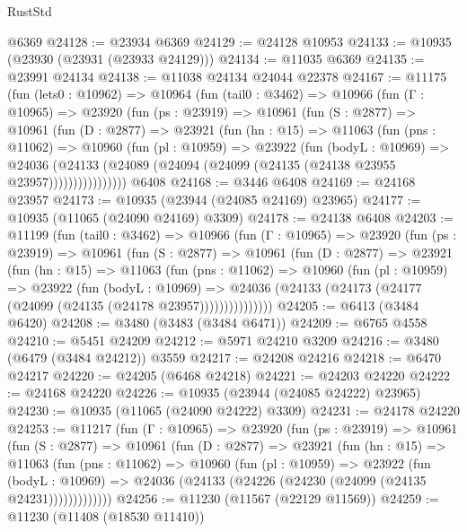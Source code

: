 \begin{lexlean}{RustStd}
\begin{coremodule}
{\begin{coremodule}
{{{{{{{{{{{{{{{{{{{{{{{{{{{{{{{{{{{{{{{{{{{{{{{{{{{{{{{{{{{{{{{{{{{{{{{{{{{{{{{{{{{{{    @6369
@24128 := @23934 @6369
@24129 := @24128 @10953
@24133 := @10935 (@23930 (@23931 (@23933 @24129)))
@24134 := @11035 @6369
@24135 := @23991 @24134
@24138 := @11038 @24134 @24044 @22378
@24167 := @11175
    (fun (lets0 : @10962) =>
    @10964
      (fun (tail0 : @3462) =>
      @10966
        (fun (Γ : @10965) =>
        @23920
          (fun (ps : @23919) =>
          @10961
            (fun (S : @2877) =>
            @10961
              (fun (D : @2877) =>
              @23921
                (fun (hn : @15) =>
                @11063
                  (fun (pns : @11062) =>
                  @10960
                    (fun (pl : @10959) =>
                    @23922
                      (fun (bodyL : @10969) =>
                      @24036
                        (@24133
                          (@24089 (@24094 (@24099 (@24135 (@24138 @23955 @23957))))))))))))))))
    @6408
@24168 := @3446 @6408
@24169 := @24168 @23957
@24173 := @10935 (@23944 (@24085 @24169) @23965)
@24177 := @10935 (@11065 (@24090 @24169) @3309)
@24178 := @24138 @6408
@24203 := @11199
    (fun (tail0 : @3462) =>
    @10966
      (fun (Γ : @10965) =>
      @23920
        (fun (ps : @23919) =>
        @10961
          (fun (S : @2877) =>
          @10961
            (fun (D : @2877) =>
            @23921
              (fun (hn : @15) =>
              @11063
                (fun (pns : @11062) =>
                @10960
                  (fun (pl : @10959) =>
                  @23922
                    (fun (bodyL : @10969) =>
                    @24036 (@24133 (@24173 (@24177 (@24099 (@24135 (@24178 @23957)))))))))))))))
@24205 := @6413 (@3484 @6420)
@24208 := @3480 (@3483 (@3484 @6471))
@24209 := @6765 @4558
@24210 := @5451 @24209
@24212 := @5971 @24210 @3209
@24216 := @3480 (@6479 (@3484 @24212)) @3559
@24217 := @24208 @24216
@24218 := @6470 @24217
@24220 := @24205 (@6468 @24218)
@24221 := @24203 @24220
@24222 := @24168 @24220
@24226 := @10935 (@23944 (@24085 @24222) @23965)
@24230 := @10935 (@11065 (@24090 @24222) @3309)
@24231 := @24178 @24220
@24253 := @11217
    (fun (Γ : @10965) =>
    @23920
      (fun (ps : @23919) =>
      @10961
        (fun (S : @2877) =>
        @10961
          (fun (D : @2877) =>
          @23921
            (fun (hn : @15) =>
            @11063
              (fun (pns : @11062) =>
              @10960
                (fun (pl : @10959) =>
                @23922
                  (fun (bodyL : @10969) =>
                  @24036 (@24133 (@24226 (@24230 (@24099 (@24135 @24231)))))))))))))
@24256 := @11230 (@11567 (@22129 @11569))
@24259 := @11230 (@11408 (@18530 @11410))
}}}}}}}}}}}}}}}}}}}}}}}}}}}}}}}}}}}}}}}}}}}}}}}}}}}}}}}}}}}}}}}}}}}}}}}}}}}}}}}}}}}}}
\end{coremodule}}
\end{coremodule}
\end{lexlean}
